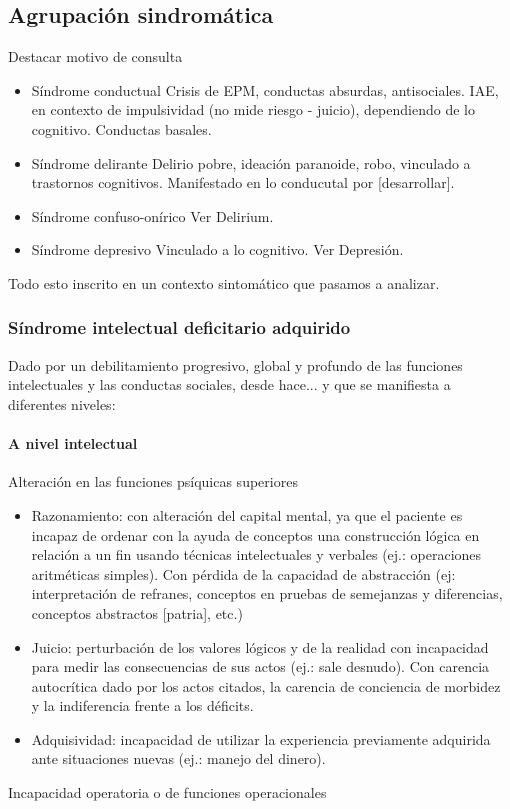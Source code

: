 \subsection*{Agrupación sindromática}
Destacar motivo de consulta
\begin{itemize}
	\item{Síndrome conductual} Crisis de EPM, conductas absurdas, antisociales. IAE, en contexto de impulsividad (no mide riesgo - juicio), dependiendo de lo cognitivo. Conductas basales.
	\item{Síndrome delirante} Delirio pobre, ideación paranoide, robo, vinculado a trastornos cognitivos. Manifestado en lo conducutal por [desarrollar].
	\item{Síndrome confuso-onírico} Ver Delirium.
	\item {Síndrome depresivo} Vinculado a lo cognitivo. Ver Depresión.
\end{itemize}
Todo esto inscrito en un contexto sintomático que pasamos a analizar.
\subsubsection*{Síndrome intelectual deficitario adquirido}
Dado por un debilitamiento progresivo, global y profundo de las funciones intelectuales y las conductas sociales, desde hace... y que se manifiesta a diferentes niveles:
\paragraph{A nivel intelectual}
Alteración en las funciones psíquicas superiores
\begin{itemize}
	\item Razonamiento: con alteración del capital mental, ya que el paciente es incapaz de ordenar con la ayuda de conceptos una construcción lógica en relación a un fin usando técnicas intelectuales y verbales (ej.: operaciones aritméticas simples). Con pérdida de la capacidad de abstracción (ej: interpretación de refranes, conceptos en pruebas de semejanzas y diferencias, conceptos abstractos [patria], etc.)
	\item Juicio: perturbación de los valores lógicos y de la realidad con incapacidad para medir las consecuencias de sus actos (ej.: sale desnudo). Con carencia autocrítica dado por los actos citados, la carencia de conciencia de morbidez y la indiferencia frente a los déficits.
	\item Adquisividad: incapacidad de utilizar la experiencia previamente adquirida ante situaciones nuevas (ej.: manejo del dinero).
\end{itemize}
Incapacidad operatoria o de funciones operacionales

